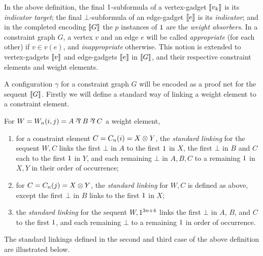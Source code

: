 \documentclass{sigplanconf}
\begin{document}
In the above definition, the final $1$-subformula of a vertex-gadget $\llbracket v_k\rrbracket$ is its \emph{indicator target}; the final $\bot$-subformula of an edge-gadget $\llbracket e\rrbracket$ is its \emph{indicator}; and in the completed encoding $\llbracket G\rrbracket$ the $p$ instances of $1$ are the \emph{weight absorbers}.
%
In a constraint graph $G$, a vertex $v$ and an edge $e$ will be called \emph{appropriate} (for each other) if $v\in v(e)$, and \emph{inappropriate} otherwise.
%
This notion is extended to vertex-gadgets $\llbracket v\rrbracket$ and edge-gadgets $\llbracket e\rrbracket$ in $\llbracket G\rrbracket$, and their respective constraint elements and weight elements.



A configuration $\gamma$ for a constraint graph $G$ will be encoded as a proof net for the sequent $\llbracket G\rrbracket$.
%
Firstly we will define a standard way of linking a weight element to a constraint element.

                                                                                                                                                                                                                                                                                                                                                                                                                                                                                  
\begin{definition}
\label{def:standard linkings}
For $W=W_n(i,j)=A\parr B\parr C$ a weight element,
\begin{enumerate}
	\item
for a constraint element $C=C_n(i)=X\otimes Y$, the \emph{standard linking} for the sequent $W,C$ links the first $\bot$ in $A$ to the first $1$ in $X$, the first $\bot$ in $B$ and $C$ each to the first $1$ in $Y$, and each remaining $\bot$ in $A,B,C$ to a remaining $1$ in $X,Y$ in their order of occurrence;
	\item
for $C=C_n(j)=X\otimes Y$, the \emph{standard linking} for $W,C$ is defined as above, except the first $\bot$ in $B$ links to the first $1$ in $X$;
	\item
the \emph{standard linking} for the sequent $W,1^{3n+4}$ links the first $\bot$ in $A$, $B$, and $C$ to the first $1$, and each remaining $\bot$ to a remaining $1$ in order of occurrence.
\end{enumerate}
\end{definition}

The standard linkings defined in the \color{red} second \color{black} and third case of the above definition are illustrated below.
\end{document}
